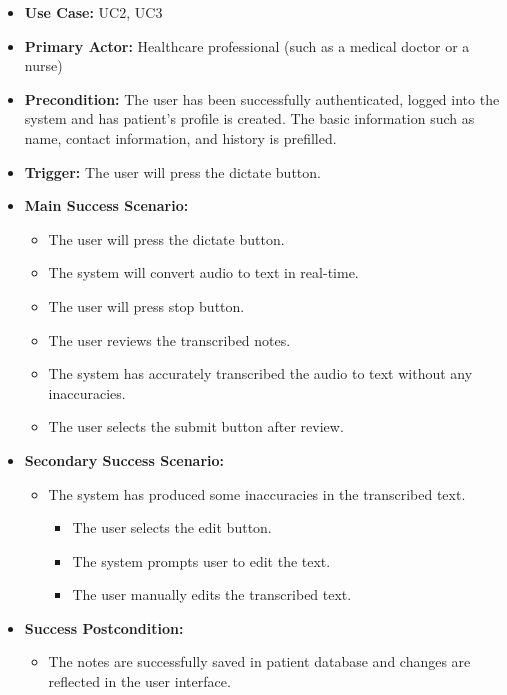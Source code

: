 \documentclass[12pt]{article}
\begin{document}
\begin{itemize}
  \item\textbf{Use Case:} UC2, UC3
  \item\textbf{Primary Actor:} Healthcare professional (such as a medical doctor or a nurse)
  \item\textbf{Precondition:} The user has been successfully authenticated, logged into the system and has patient’s profile is created. The basic information such as name, contact information, and history is prefilled.
  \item\textbf{Trigger:} The user will press the dictate button.
  \item\textbf{Main Success Scenario:}
  \begin{itemize}
    \item The user will press the dictate button.
    \item The system will convert audio to text in real-time.
    \item The user will press stop button.
    \item The user reviews the transcribed notes. 
    \item The system has accurately transcribed the audio to text without any inaccuracies.
    \item The user selects the submit button after review. 
  \end{itemize}
  \item\textbf{Secondary Success Scenario:}
  \begin{itemize}
    \item The system has produced some inaccuracies in the transcribed text.
    \begin{itemize}
      \item The user selects the edit button.
      \item The system prompts user to edit the text.
      \item The user manually edits the transcribed text.
    \end{itemize} 
  \end{itemize}
  \item\textbf{Success Postcondition:}
  \begin{itemize}
    \item The notes are successfully saved in patient database and changes are reflected in the user interface.
  \end{itemize}
\end{itemize}
\end{document}
